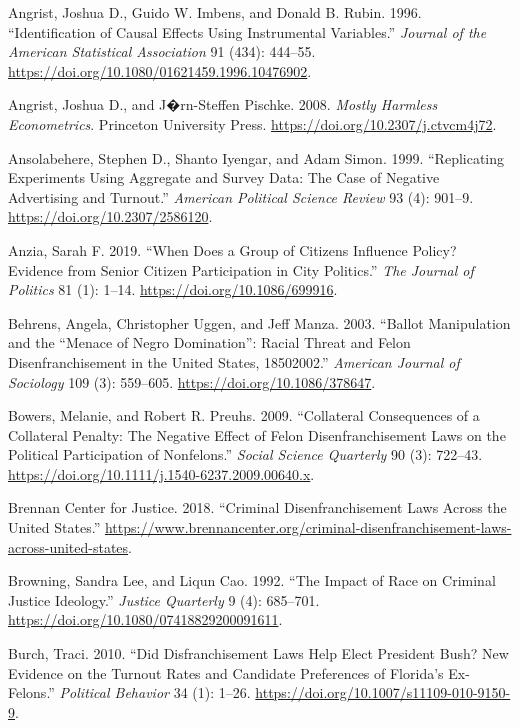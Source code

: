 \documentclass[]{article}
\begin{document}
\leavevmode\hypertarget{ref-Angrist1996}{}%
Angrist, Joshua D., Guido W. Imbens, and Donald B. Rubin. 1996. ``Identification of Causal Effects Using Instrumental Variables.'' \emph{Journal of the American Statistical Association} 91 (434): 444--55. \url{https://doi.org/10.1080/01621459.1996.10476902}.

\leavevmode\hypertarget{ref-Angrist2008}{}%
Angrist, Joshua D., and J�rn-Steffen Pischke. 2008. \emph{Mostly Harmless Econometrics}. Princeton University Press. \url{https://doi.org/10.2307/j.ctvcm4j72}.

\leavevmode\hypertarget{ref-Ansolabehere1999}{}%
Ansolabehere, Stephen D., Shanto Iyengar, and Adam Simon. 1999. ``Replicating Experiments Using Aggregate and Survey Data: The Case of Negative Advertising and Turnout.'' \emph{American Political Science Review} 93 (4): 901--9. \url{https://doi.org/10.2307/2586120}.

\leavevmode\hypertarget{ref-Anzia2019}{}%
Anzia, Sarah F. 2019. ``When Does a Group of Citizens Influence Policy? Evidence from Senior Citizen Participation in City Politics.'' \emph{The Journal of Politics} 81 (1): 1--14. \url{https://doi.org/10.1086/699916}.

\leavevmode\hypertarget{ref-Behrens2003}{}%
Behrens, Angela, Christopher Uggen, and Jeff Manza. 2003. ``Ballot Manipulation and the ``Menace of Negro Domination'': Racial Threat and Felon Disenfranchisement in the United States, 18502002.'' \emph{American Journal of Sociology} 109 (3): 559--605. \url{https://doi.org/10.1086/378647}.

\leavevmode\hypertarget{ref-Bowers2009}{}%
Bowers, Melanie, and Robert R. Preuhs. 2009. ``Collateral Consequences of a Collateral Penalty: The Negative Effect of Felon Disenfranchisement Laws on the Political Participation of Nonfelons.'' \emph{Social Science Quarterly} 90 (3): 722--43. \url{https://doi.org/10.1111/j.1540-6237.2009.00640.x}.

\leavevmode\hypertarget{ref-bcj_laws}{}%
Brennan Center for Justice. 2018. ``Criminal Disenfranchisement Laws Across the United States.'' \url{https://www.brennancenter.org/criminal-disenfranchisement-laws-across-united-states}.

\leavevmode\hypertarget{ref-Browning1992}{}%
Browning, Sandra Lee, and Liqun Cao. 1992. ``The Impact of Race on Criminal Justice Ideology.'' \emph{Justice Quarterly} 9 (4): 685--701. \url{https://doi.org/10.1080/07418829200091611}.

\leavevmode\hypertarget{ref-Burch2010}{}%
Burch, Traci. 2010. ``Did Disfranchisement Laws Help Elect President Bush? New Evidence on the Turnout Rates and Candidate Preferences of Florida's Ex-Felons.'' \emph{Political Behavior} 34 (1): 1--26. \url{https://doi.org/10.1007/s11109-010-9150-9}.
\end{document}
